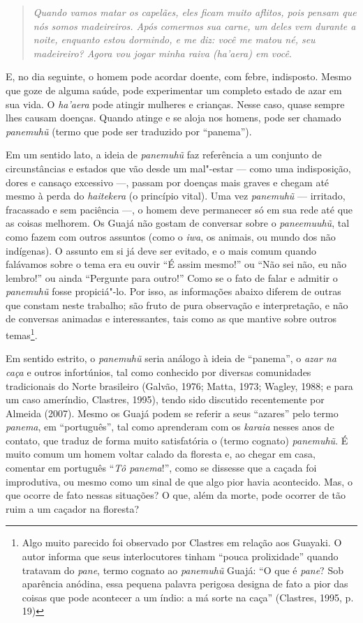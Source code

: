\begin{quote}
\emph{Quando vamos matar os capelães, eles ficam muito aflitos, pois pensam
que nós somos madeireiros. Após comermos sua carne, um deles vem durante
a noite, enquanto estou dormindo, e me diz: \emph{você me matou né, seu
madeireiro? Agora vou jogar minha raiva (ha'aera) em você}}.
\end{quote}

E, no dia seguinte, o homem pode acordar doente, com febre, indisposto.
Mesmo que goze de alguma saúde, pode experimentar um completo estado de
azar em sua vida. O \emph{ha'aera} pode atingir mulheres e crianças.
Nesse caso, quase sempre lhes causam doenças. Quando atinge e se aloja
nos homens, pode ser chamado \emph{panemuhũ} (termo que pode ser
traduzido por ``panema'').

Em um sentido lato, a ideia de \emph{panemuhũ} faz referência a um
conjunto de circunstâncias e estados que vão desde um mal"-estar --- como
uma indisposição, dores e cansaço excessivo ---, passam por doenças mais
graves e chegam até mesmo à perda do \emph{haitekera} (o princípio
vital). Uma vez \emph{panemuhũ} --- irritado, fracassado e sem paciência
---, o homem deve permanecer só em sua rede até que as coisas melhorem. Os
Guajá não gostam de conversar sobre o \emph{paneemuuhũ}, tal como fazem
com outros assuntos (como o \emph{iwa}, os animais, ou mundo dos não
indígenas). O assunto em si já deve ser evitado, e o mais comum quando
falávamos sobre o tema era eu ouvir ``É assim mesmo!'' ou ``Não sei não, eu
não lembro!'' ou ainda ``Pergunte para outro!'' Como se o fato de falar e
admitir o \emph{panemuhũ} fosse propiciá"-lo. Por isso, as informações
abaixo diferem de outras que constam neste trabalho; são fruto de pura
observação e interpretação, e não de conversas animadas e interessantes,
tais como as que mantive sobre outros temas\footnote{Algo muito parecido
  foi observado por Clastres em relação aos Guayaki. O autor informa que
  seus interlocutores tinham ``pouca prolixidade'' quando tratavam do
  \emph{pane}, termo cognato ao \emph{panemuhũ} Guajá: ``O que é
  \emph{pane}? Sob aparência anódina, essa pequena palavra perigosa
  designa de fato a pior das coisas que pode acontecer a um índio: a má
  sorte na caça'' (Clastres, 1995, p. 19)}.

Em sentido estrito, o \emph{panemuhũ} seria análogo à ideia de ``panema'',
o \emph{azar na caça} e outros infortúnios, tal como conhecido por
diversas comunidades tradicionais do Norte brasileiro (Galvão, 1976;
Matta, 1973; Wagley, 1988; e para um caso ameríndio, Clastres, 1995),
tendo sido discutido recentemente por Almeida (2007). Mesmo os Guajá
podem se referir a seus ``azares'' pelo termo \emph{panema}, em
``português'', tal como aprenderam com os \emph{karaia} nesses anos de
contato, que traduz de forma muito satisfatória o (termo cognato)
\emph{panemuhũ}. É muito comum um homem voltar calado da floresta e, ao
chegar em casa, comentar em português ``\emph{Tô panema}!'', como se
dissesse que a caçada foi improdutiva, ou mesmo como um sinal de que
algo pior havia acontecido. Mas, o que ocorre de fato nessas situações?
O que, além da morte, pode ocorrer de tão ruim a um caçador na floresta?

